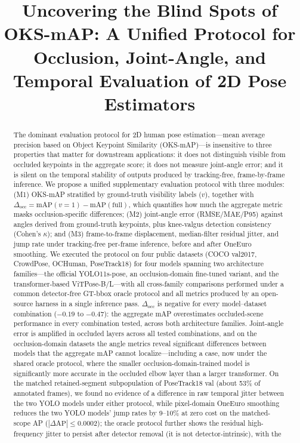 \documentclass[10pt,conference]{IEEEtran}
\begin{document}
\title{Uncovering the Blind Spots of OKS-mAP: A Unified Protocol for Occlusion, Joint-Angle, and Temporal Evaluation of 2D Pose Estimators}

\author{
}

\maketitle

\begin{abstract}
The dominant evaluation protocol for 2D human pose estimation---mean average precision based on Object Keypoint Similarity (OKS-mAP)---is insensitive to three properties that matter for downstream applications: it does not distinguish visible from occluded keypoints in the aggregate score; it does not measure joint-angle error; and it is silent on the temporal stability of outputs produced by tracking-free, frame-by-frame inference. We propose a unified supplementary evaluation protocol with three modules: (M1) OKS-mAP stratified by ground-truth visibility labels ($v$), together with $\Delta_{\mathrm{occ}}=\mathrm{mAP}(v{=}1)-\mathrm{mAP}(\mathrm{full})$, which quantifies how much the aggregate metric masks occlusion-specific differences; (M2) joint-angle error (RMSE/MAE/P95) against angles derived from ground-truth keypoints, plus knee-valgus detection consistency (Cohen's $\kappa$); and (M3) frame-to-frame displacement, median-filter residual jitter, and jump rate under tracking-free per-frame inference, before and after OneEuro smoothing. We executed the protocol on four public datasets (COCO val2017, CrowdPose, OCHuman, PoseTrack18) for four models spanning two architecture families---the official YOLO11s-pose, an occlusion-domain fine-tuned variant, and the transformer-based ViTPose-B/L---with all cross-family comparisons performed under a common detector-free GT-bbox oracle protocol and all metrics produced by an open-source harness in a single inference pass. $\Delta_{\mathrm{occ}}$ is negative for every model--dataset combination ($-0.19$ to $-0.47$): the aggregate mAP overestimates occluded-scene performance in every combination tested, across both architecture families. Joint-angle error is amplified in occluded layers across all tested combinations, and on the occlusion-domain datasets the angle metrics reveal significant differences between models that the aggregate mAP cannot localize---including a case, now under the shared oracle protocol, where the smaller occlusion-domain-trained model is significantly more accurate in the occluded elbow layer than a larger transformer. On the matched retained-segment subpopulation of PoseTrack18 val (about 53\% of annotated frames), we found no evidence of a difference in raw temporal jitter between the two YOLO models under either protocol, while pixel-domain OneEuro smoothing reduces the two YOLO models' jump rates by 9--10\% at zero cost on the matched-scope AP ($|\Delta\mathrm{AP}|\le 0.0002$); the oracle protocol further shows the residual high-frequency jitter to persist after detector removal (it is not detector-intrinsic), with the 
\end{abstract}
\end{document}
